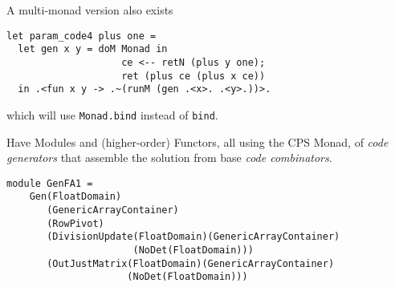 \documentclass[landscape]{slides}
\begin{document}
\begin{slide}
A multi-monad version also exists
\begin{verbatim}
let param_code4 plus one =
  let gen x y = doM Monad in
                    ce <-- retN (plus y one);
                    ret (plus ce (plus x ce))
  in .<fun x y -> .~(runM (gen .<x>. .<y>.))>.
\end{verbatim}
which will use \verb+Monad.bind+ instead of \verb+bind+.
\end{slide}

\begin{slide}
    Have Modules and (higher-order) Functors, all using the CPS Monad, of
    \emph{code generators} that assemble the solution from base \emph{code
    combinators}.
\begin{verbatim}
module GenFA1 = 
    Gen(FloatDomain)
       (GenericArrayContainer)
       (RowPivot)
       (DivisionUpdate(FloatDomain)(GenericArrayContainer)
                      (NoDet(FloatDomain)))
       (OutJustMatrix(FloatDomain)(GenericArrayContainer)
                     (NoDet(FloatDomain)))
\end{verbatim}
\end{slide}
\end{document}
